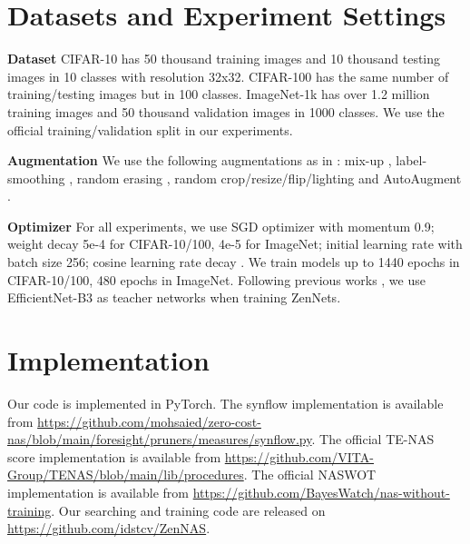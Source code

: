 \documentclass{article}
\renewcommand{\topfraction}{.99}
\renewcommand{\floatpagefraction}{.99}
\providecommand{\citep}{\cite}
\begin{document}
{\small


}

\clearpage \newpage
\appendix

\renewcommand{\topfraction}{.99}
\renewcommand{\floatpagefraction}{.99}\setlength{\dblfloatsep}{1ex}

\section{Datasets and Experiment Settings}
\label{sec:Datasets-and-Experiment-Settings}

\noindent \textbf{Dataset} CIFAR-10 has 50 thousand training images and 10 thousand testing images in 10 classes with resolution 32x32. CIFAR-100 has the same number of training/testing images but in 100 classes. ImageNet-1k has over 1.2 million training images and 50 thousand validation images in 1000 classes. We use the official training/validation split in our experiments.

\noindent \textbf{Augmentation} We use the following augmentations as in \citep{phamEfficientNeuralArchitecture2018a}: mix-up \citep{zhangMixupEmpiricalRisk2018}, label-smoothing \citep{szegedyRethinkingInceptionArchitecture2016}, random erasing \citep{zhongRandomErasingData2020}, random crop/resize/flip/lighting and AutoAugment \citep{cubukAutoAugmentLearningAugmentation2018}.

\noindent \textbf{Optimizer} For all experiments, we use SGD optimizer with momentum 0.9; weight decay 5e-4 for CIFAR-10/100, 4e-5 for ImageNet; initial learning rate  with batch size 256; cosine learning rate decay \citep{loshchilovSGDRStochasticGradient2017}. We train models up to 1440 epochs in CIFAR-10/100, 480 epochs in ImageNet. Following previous works \citep{aguilarKnowledgeDistillationInternal2020,liBlockwiselySupervisedNeural2020,caiOnceforAllTrainOne2020}, we use EfficientNet-B3 as teacher networks when training ZenNets.


\section{Implementation}

Our code is implemented in PyTorch. The synflow implementation is available from \url{https://github.com/mohsaied/zero-cost-nas/blob/main/foresight/pruners/measures/synflow.py}. The official TE-NAS score implementation is available from \url{https://github.com/VITA-Group/TENAS/blob/main/lib/procedures}. The official NASWOT implementation is available from \url{https://github.com/BayesWatch/nas-without-training}.
Our searching and training code are released on \url{https://github.com/idstcv/ZenNAS}. 
\end{document}

